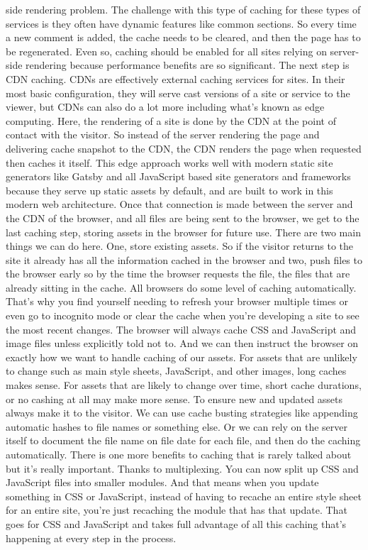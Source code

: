 side rendering problem. The challenge with this type of caching for these types of
services is they often have dynamic features like common sections. So every time 
a new comment is added, the cache needs to be cleared, and then the page has to 
be regenerated. Even so, caching should be enabled for all sites relying on 
server-side rendering because performance benefits are so significant. The next 
step is CDN caching. CDNs are effectively external caching services for sites. In 
their most basic configuration, they will serve cast versions of a site or 
service to the viewer, but CDNs can also do a lot more including what's known as
edge computing. Here, the rendering of a site is done by the CDN at the point of
contact with the visitor. So instead of the server rendering the page and 
delivering cache snapshot to the CDN, the CDN renders the page when requested 
then caches it itself. This edge approach works well with modern static site 
generators like Gatsby and all JavaScript based site generators and frameworks 
because they serve up static assets by default, and are built to work in this 
modern web architecture. Once that connection is made between the server and 
the CDN of the browser, and all files are being sent to the browser, we get to 
the last caching step, storing assets in the browser for future use. There are 
two main things we can do here. One, store existing assets. So if the visitor 
returns to the site it already has all the information cached in the browser 
and two, push files to the browser early so by the time the browser requests 
the file, the files that are already sitting in the cache. All browsers do 
some level of caching automatically. That's why you find yourself needing to 
refresh your browser multiple times or even go to incognito mode or clear the
cache when you're developing a site to see the most recent changes. The 
browser will always cache CSS and JavaScript and image files unless 
explicitly told not to. And we can then instruct the browser on exactly how 
we want to handle caching of our assets. For assets that are unlikely to 
change such as main style sheets, JavaScript, and other images, long caches 
makes sense. For assets that are likely to change over time, short cache 
durations, or no cashing at all may make more sense. To ensure new and 
updated assets always make it to the visitor. We can use cache busting 
strategies like appending automatic hashes to file names or something else. 
Or we can rely on the server itself to document the file name on file date 
for each file, and then do the caching automatically. There is one more 
benefits to caching that is rarely talked about but it's really important. 
Thanks to multiplexing. You can now split up CSS and JavaScript files into 
smaller modules. And that means when you update something in CSS or 
JavaScript, instead of having to recache an entire style sheet for an entire
site, you're just recaching the module that has that update. That goes for 
CSS and JavaScript and takes full advantage of all this caching that's 
happening at every step in the process.



